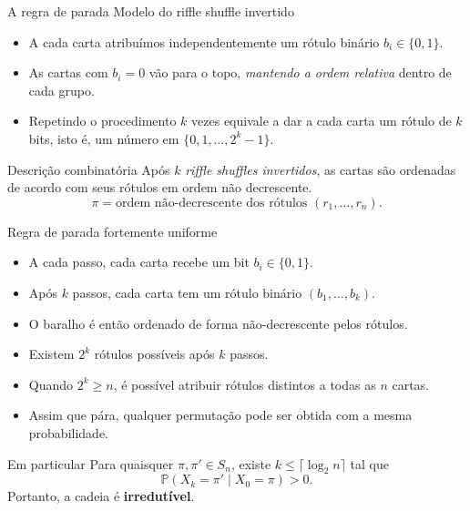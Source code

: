 \documentclass{beamer}
\begin{document}
\begin{frame}
{A regra de parada}
{Modelo do riffle shuffle invertido}

  \begin{itemize}
  \item A cada carta atribuímos independentemente um rótulo binário
    $b_i \in \{0,1\}$.
  \item As cartas com $b_i=0$ vão para o topo,\textit{ mantendo a ordem
      relativa} dentro de cada grupo.
  \item Repetindo o procedimento $k$ vezes equivale a dar a cada carta
    um rótulo de $k$ bits, isto é, um número em $\{0,1,\dots,2^k-1\}$.
  \end{itemize}


\begin{block}{Descrição combinatória}
  Após $k$ \emph{riffle shuffles invertidos}, as cartas são ordenadas
  de acordo com seus rótulos em ordem não decrescente.  
\[
\pi = \text{ordem não-decrescente dos rótulos } (r_1,\dots,r_n).
\]
\end{block}
\end{frame}
\begin{frame}{Regra de parada fortemente uniforme}
  
  \begin{itemize}
  \item A cada passo, cada carta recebe um bit $b_i \in \{0,1\}$.
  \item Após $k$ passos, cada carta tem um rótulo binário
    $(b_1,\dots,b_k)$.
  \item O baralho é então ordenado de forma não-decrescente pelos
    rótulos.
  \item Existem $2^k$ rótulos possíveis após $k$ passos.

    
  \item Quando $2^k \ge n$, é possível atribuir rótulos distintos a
    todas as $n$ cartas.
  \item Assim que pára, qualquer permutação pode ser obtida com a mesma
    probabilidade.
  \end{itemize}
  
  
  \begin{block}{Em particular}
    Para quaisquer $\pi, \pi' \in S_n$, existe
    $k \le \lceil \log_2 n \rceil$ tal que
    \[
      \mathbb{P}(X_k = \pi' \mid X_0 = \pi) > 0.
    \]
    Portanto, a cadeia é \textbf{irredutível}.
  \end{block}
  
\end{frame}
\end{document}
